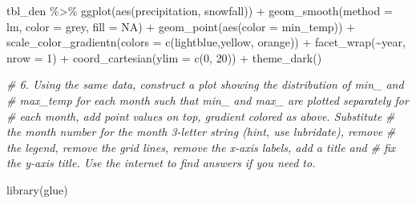 \documentclass[
]{book}
\newenvironment{Shaded}{\begin{snugshade}}{\end{snugshade}}
\newcommand{\AttributeTok}[1]{\textcolor[rgb]{0.77,0.63,0.00}{#1}}
\newcommand{\CommentTok}[1]{\textcolor[rgb]{0.56,0.35,0.01}{\textit{#1}}}
\newcommand{\ConstantTok}[1]{\textcolor[rgb]{0.00,0.00,0.00}{#1}}
\newcommand{\DecValTok}[1]{\textcolor[rgb]{0.00,0.00,0.81}{#1}}
\newcommand{\FunctionTok}[1]{\textcolor[rgb]{0.00,0.00,0.00}{#1}}
\newcommand{\NormalTok}[1]{#1}
\newcommand{\SpecialCharTok}[1]{\textcolor[rgb]{0.00,0.00,0.00}{#1}}
\newcommand{\StringTok}[1]{\textcolor[rgb]{0.31,0.60,0.02}{#1}}
\begin{document}
\begin{Shaded}
\begin{Highlighting}[]
\NormalTok{tbl\_den }\SpecialCharTok{\%\textgreater{}\%} 
  \FunctionTok{ggplot}\NormalTok{(}\FunctionTok{aes}\NormalTok{(precipitation, snowfall)) }\SpecialCharTok{+} 
  \FunctionTok{geom\_smooth}\NormalTok{(}\AttributeTok{method =}\NormalTok{ lm, }\AttributeTok{color =} \StringTok{\textquotesingle{}grey\textquotesingle{}}\NormalTok{, }\AttributeTok{fill =} \ConstantTok{NA}\NormalTok{) }\SpecialCharTok{+}
  \FunctionTok{geom\_point}\NormalTok{(}\FunctionTok{aes}\NormalTok{(}\AttributeTok{color =}\NormalTok{ min\_temp)) }\SpecialCharTok{+}
  \FunctionTok{scale\_color\_gradientn}\NormalTok{(}\AttributeTok{colors =} \FunctionTok{c}\NormalTok{(}\StringTok{\textquotesingle{}lightblue\textquotesingle{}}\NormalTok{,}\StringTok{\textquotesingle{}yellow\textquotesingle{}}\NormalTok{, }\StringTok{\textquotesingle{}orange\textquotesingle{}}\NormalTok{)) }\SpecialCharTok{+}
  \FunctionTok{facet\_wrap}\NormalTok{(}\SpecialCharTok{\textasciitilde{}}\NormalTok{year, }\AttributeTok{nrow =} \DecValTok{1}\NormalTok{) }\SpecialCharTok{+}
  \FunctionTok{coord\_cartesian}\NormalTok{(}\AttributeTok{ylim =} \FunctionTok{c}\NormalTok{(}\DecValTok{0}\NormalTok{, }\DecValTok{20}\NormalTok{)) }\SpecialCharTok{+}
  \FunctionTok{theme\_dark}\NormalTok{()}


\CommentTok{\# 6. Using the same data, construct a plot showing the distribution of min\_ and }
\CommentTok{\#    max\_temp for each month such that min\_ and max\_ are plotted separately for }
\CommentTok{\#    each month, add point values on top, gradient colored as above. Substitute }
\CommentTok{\#    the month number for the month 3{-}letter string (hint, use lubridate), remove }
\CommentTok{\#    the legend, remove the grid lines, remove the x{-}axis labels, add a title and }
\CommentTok{\#    fix the y{-}axis title. Use the internet to find answers if you need to.}

\FunctionTok{library}\NormalTok{(glue)}


\end{Highlighting}
\end{Shaded}
\end{document}
